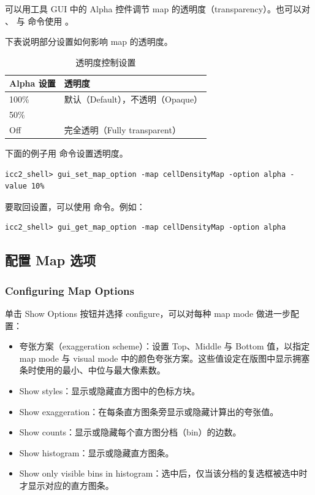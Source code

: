 可以用工具 GUI 中的 Alpha 控件调节 map 的透明度（transparency）。也可以对 、 与  命令使用  。

下表说明部分设置如何影响 map 的透明度。

\begin{table}[htbp]
\centering
\caption{透明度控制设置}
\begin{tabularx}{\textwidth}{@{}l X@{}}
\toprule
Alpha 设置 & 透明度 \\
\midrule
100\% & 默认（Default），不透明（Opaque） \\
50\% & \\
Off & 完全透明（Fully transparent） \\
\bottomrule
\end{tabularx}
\end{table}

下面的例子用  命令设置透明度。
\begin{lstlisting}
icc2_shell> gui_set_map_option -map cellDensityMap -option alpha -value 10%
\end{lstlisting}

要取回设置，可以使用  命令。例如：
\begin{lstlisting}
icc2_shell> gui_get_map_option -map cellDensityMap -option alpha
\end{lstlisting}

\subsection{配置 Map 选项}
\subsubsection*{Configuring Map Options}

单击 Show Options 按钮并选择 configure，可以对每种 map mode 做进一步配置：
\begin{itemize}
  \item 夸张方案（exaggeration scheme）：设置 Top、Middle 与 Bottom 值，以指定 map mode 与 visual mode 中的颜色夸张方案。这些值设定在版图中显示拥塞条时使用的最小、中位与最大像素数。
  \item Show styles：显示或隐藏直方图中的色标方块。
  \item Show exaggeration：在每条直方图条旁显示或隐藏计算出的夸张值。
  \item Show counts：显示或隐藏每个直方图分档（bin）的边数。
  \item Show histogram：显示或隐藏直方图条。
  \item Show only visible bins in histogram：选中后，仅当该分档的复选框被选中时才显示对应的直方图条。
\end{itemize}

